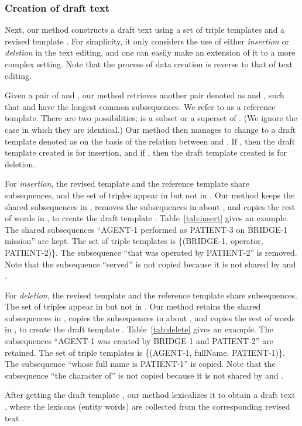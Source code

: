 \documentclass[11pt,a4paper]{article}
\begin{document}
\subsubsection*{Creation of draft text}

Next, our method constructs a draft text  using a set of triple templates  and a revised template . For simplicity, it only considers the use of either \textit{insertion} or \textit{deletion} in the text editing, and one can easily make an extension of it to a more complex setting.  Note that the process of data creation is reverse to that of text editing.

Given a pair of  and , our method retrieves another pair denoted as  and , such that  and   have the longest common subsequences. We refer to  as a reference template. There are two possibilities;  is a subset or a superset of . (We ignore the case in which they are identical.) Our method then manages to change  to a draft template denoted as  on the basis of the relation between  and . If , then the draft template  created is for insertion, and if , then the draft template  created is for deletion.

For \textit{insertion}, the revised template  and the reference template  share subsequences, and the set of triples  appear in  but not in .  Our method keeps the shared subsequences in , removes the subsequences in  about , and copies the rest of words in , to create the draft template . Table~\ref{tab:insert} gives an example. The shared subsequences ``AGENT-1 performed as PATIENT-3 on BRIDGE-1 mission'' are kept. The set of triple templates  is \{(BRIDGE-1, operator, PATIENT-2)\}. The subsequence ``that was operated by PATIENT-2'' is removed. Note that the subsequence ``served'' is not copied because it is not shared by  and .

For \textit{deletion}, the revised template  and the reference template  share subsequences. The set of triples  appear in  but not in .  Our method retains the shared subsequences in , copies the subsequences in  about , and copies the rest of words in , to create the draft template . Table~\ref{tab:delete} gives an example. The subsequences ``AGENT-1 was created by BRIDGE-1 and PATIENT-2'' are retained. The set of triple templates  is \{(AGENT-1, fullName, PATIENT-1)\}. The subsequence ``whose full name is PATIENT-1'' is copied. Note that the subsequence ``the character of'' is not copied because it is not shared by  and .

After getting the draft template , our method lexicalizes it to obtain a draft text , where the lexicons (entity words) are collected from the corresponding revised text .
\end{document}
